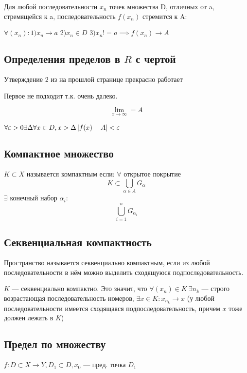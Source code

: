 Для любой последовательности ${x_n}$ точек множества D, отличных от a, стремящейся к a, последовательность ${f(x_n)}$ стремится к A:

$\forall (x_n) : 1) x_n \to a $ $ 2) x_n \in D $ $ 3) x_n != a  \implies f(x_n) \to  A$

\newpage
\subsection{Определения пределов в $R$ с чертой}
Утверждение 2 из на прошлой странице прекрасно работает 

Первое не подходит т.к. очень далеко.

$$\lim_{x \to \infty} = A $$

$\forall \varepsilon > 0 \exists \Delta \forall x \in D, x > \Delta \left| f(x) - A \right| < \varepsilon$

\newpage
\subsection{Компактное множество}
$K \subset X$ называется компактным если:
$\forall$ открытое покрытие $$K \subset \bigcup_{\alpha \in A}G_\alpha$$
$\exists$ конечный набор $\alpha_i : $ $$\bigcup_{i = 1}^nG_{\alpha_i}$$

\newpage
\subsection{Секвенциальная компактность}
Пространство называется секвенциально компактным, если из любой последовательности в нём можно выделить сходящуюся подпоследовательность.


 $K$ --- секвенциально компактно. Это значит, что $\forall (x_n) \in K  \ \exists n_k$ --- строго возрастающая последовательность номеров, $\exists x \in K: x_{n_k} \to x$ (у любой последовательности имеется сходящаяся подпоследовательность, причем $x$ тоже должен лежать в $K$)
 
\newpage
{}
\subsection{Предел по множеству}
$f : D\subset X\to Y, D_1\subset D, x_0$ --- пред. точка $D_1$

